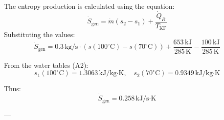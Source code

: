 The entropy production is calculated using the equation:  
\[
\dot{S}_{\text{gen}} = \dot{m} (s_2 - s_1) + \frac{\dot{Q}_R}{T_{\text{KF}}}
\]  
Substituting the values:  
\[
\dot{S}_{\text{gen}} = 0.3 \, \text{kg/s} \cdot (s(100^\circ\text{C}) - s(70^\circ\text{C})) + \frac{653 \, \text{kJ}}{285 \, \text{K}} - \frac{100 \, \text{kJ}}{285 \, \text{K}}
\]  

From the water tables (A2):  
\[
s_1(100^\circ\text{C}) = 1.3063 \, \text{kJ/kg·K}, \quad s_2(70^\circ\text{C}) = 0.9349 \, \text{kJ/kg·K}
\]  

Thus:  
\[
\dot{S}_{\text{gen}} = 0.258 \, \text{kJ/s·K}
\]  

---